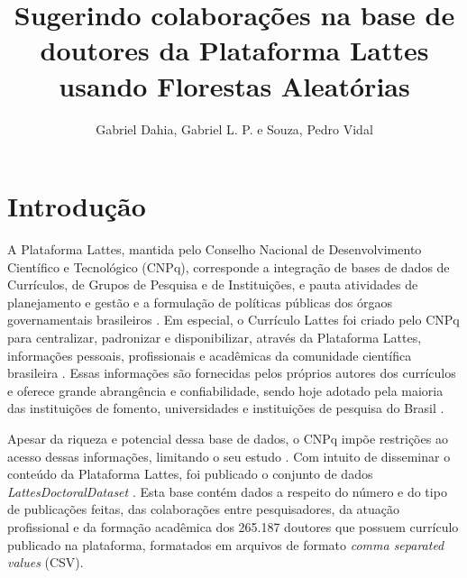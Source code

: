 \documentclass[12pt]{article}
\title{Sugerindo colaborações na base de doutores da Plataforma Lattes usando Florestas Aleatórias}
\author{Gabriel Dahia, Gabriel L. P. e Souza, Pedro Vidal}
\begin{document}
 

\maketitle

     


\section{Introdução}

A Plataforma Lattes, mantida pelo Conselho Nacional de Desenvolvimento Científico e Tecnológico (CNPq), corresponde a integração de bases de dados de Currículos, de Grupos de Pesquisa e de Instituições, e pauta atividades de planejamento e gestão e a formulação de políticas públicas dos órgaos governamentais brasileiros \cite{lattes-cnpq}.
Em especial, o Currículo Lattes foi criado pelo CNPq para centralizar, padronizar e disponibilizar, através da Plataforma Lattes, informações pessoais, profissionais e acadêmicas da comunidade científica brasileira \cite{sucupira}.
Essas informações são fornecidas pelos próprios autores dos currículos \cite{sucupira} e oferece grande abrangência e confiabilidade, sendo hoje adotado pela maioria das instituições de fomento, universidades e instituições de pesquisa do Brasil \cite{lattes-cnpq}.

Apesar da riqueza e potencial dessa base de dados, o CNPq impõe restrições ao acesso dessas informações, limitando o seu estudo \cite{lattes-dataset}.
Com intuito de disseminar o conteúdo da Plataforma Lattes, foi publicado o conjunto de dados \emph{LattesDoctoralDataset} \cite{lattes-dataset}.
Esta base contém dados a respeito do número e do tipo de publicações feitas, das colaborações entre pesquisadores, da atuação profissional e da formação acadêmica dos 265.187 doutores que possuem currículo publicado na plataforma, formatados em arquivos de formato \textit{comma separated values} (CSV).
\end{document}

